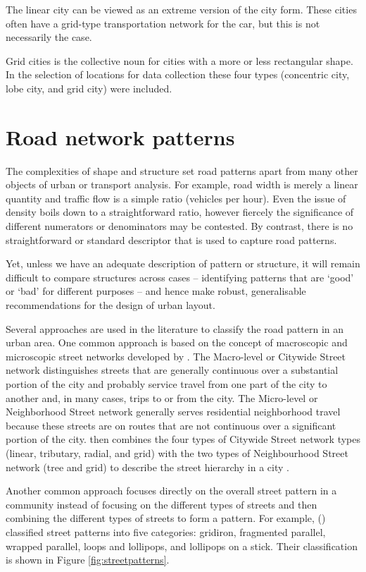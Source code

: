 The linear city can be viewed as an extreme version of the city form. These cities often have a grid-type transportation network for the car, but this is not necessarily the case. 

Grid cities is the collective noun for cities with a more or less rectangular shape. In the selection of locations for data collection these four types (concentric city, lobe city, and grid city) were included.

\section{Road network patterns}
The complexities of shape and structure set road patterns apart from many other objects of urban or transport analysis. For example, road width is merely a linear quantity and traffic flow is a simple ratio (vehicles per hour). Even the issue of density boils down to a straightforward ratio, however fiercely the significance of different numerators or denominators may be contested. By contrast, there is no straightforward or standard descriptor that is used to capture road patterns. 

Yet, unless we have an adequate description of pattern or structure, it will remain difficult to compare structures across cases – identifying patterns that are ‘good’ or ‘bad’ for different purposes – and hence make robust, generalisable recommendations for the design of urban layout.

Several approaches are used in the literature to classify the road pattern in an urban area. One common approach is based on the concept of macroscopic and microscopic street networks developed by \cite{Marshall:2005}. The Macro-level or Citywide Street network distinguishes streets that are generally continuous over a substantial portion of the city and probably service travel from one part of the city to another and, in many cases, trips to or from the city. The Micro-level or Neighborhood Street network generally serves residential neighborhood travel because these streets are on routes that are not continuous over a significant portion of the city. \cite{Marshall:2005} then combines the four types of Citywide Street network types (linear, tributary, radial, and grid) with the two types of Neighbourhood Street network (tree and grid) to describe the street hierarchy in a city \cite{Marshall:2010, Marshall:2011}. 

Another common approach focuses directly on the overall street pattern in a community instead of focusing on the different types of streets and then combining the different types of streets to form a pattern. For example, (\cite{Southworth:2003}) classified street patterns into five categories: gridiron, fragmented parallel, wrapped parallel, loops and lollipops, and lollipops on a stick. Their classification is shown in Figure \ref{fig:streetpatterns}.

